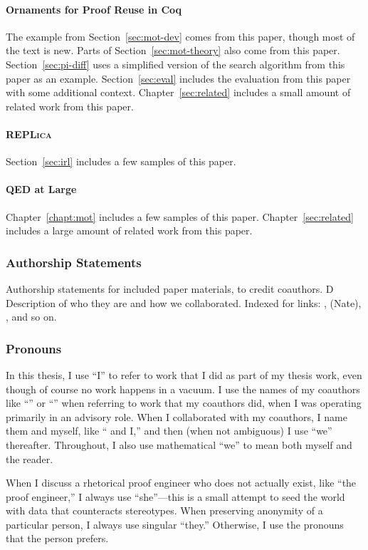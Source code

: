 \paragraph{Ornaments for Proof Reuse in Coq}
The example from Section~\ref{sec:mot-dev} comes from this paper, though most of the text is new.
Parts of Section~\ref{sec:mot-theory} also come from this paper.
Section~\ref{sec:pi-diff} uses a simplified version of the search algorithm from this paper as an example.
Section~\ref{sec:eval} includes the evaluation from this paper with some additional context.
Chapter~\ref{sec:related} includes a small amount of related work from this paper.

\paragraph{\textsc{REPLica}}
Section~\ref{sec:irl} includes a few samples of this paper.

\paragraph{QED at Large}
Chapter~\ref{chapt:mot} includes a few samples of this paper.
Chapter~\ref{sec:related} includes a large amount of related work from this paper.

\subsubsection*{Authorship Statements}

Authorship statements for included paper materials, to credit coauthors. D
Description of who they are and how we collaborated.
Indexed for links: ,  (Nate),
, and so on.

\subsubsection*{Pronouns}

In this thesis, I use ``I'' to refer to work that I did as part of my thesis work,
even though of course no work happens in a vacuum.
I use the names of my coauthors like ``'' or ``'' when referring to work that my coauthors did,
when I was operating primarily in an advisory role.
When I collaborated with my coauthors, I name them and myself, like `` and I,''
and then (when not ambiguous) I use ``we'' thereafter.
Throughout, I also use mathematical ``we'' to mean both myself and the reader.

When I discuss a rhetorical proof engineer who does not actually exist,
like ``the proof engineer,'' I always use ``she''---this is a small attempt
to seed the world with data that counteracts stereotypes. 
When preserving anonymity of a particular person, I always use singular ``they.''
Otherwise, I use the pronouns that the person prefers.



